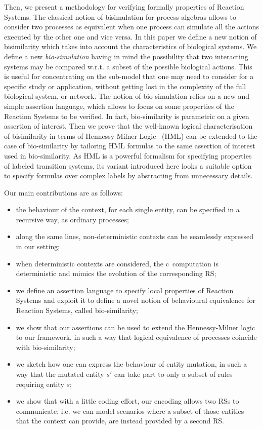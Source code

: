 Then, we present a methodology for verifying formally
properties of Reaction Systems. The classical notion of bisimulation for 
process algebras allows to consider two processes as equivalent 
when one process can simulate all the actions executed 
by the other one and vice versa. In this paper we define a new
notion of bisimilarity which takes into account the characteristics
of biological systems. We define a new {\em bio-simulation} having in mind
the possibility that two interacting systems may be compared w.r.t.
a subset of the possible biological actions. This is useful for concentrating 
on the sub-model that one may need to consider for a specific study or application,
without getting lost in the complexity of the full biological system, or network.
The notion of bio-simulation relies on a new and simple assertion language,
which allows to focus on some properties of the Reaction Systems to be verified.
In fact, bio-similarity is parametric on a given assertion of interest.
Then we prove that the well-known logical characterisation of bisimilarity in terms of Hennessy-Milner Logic~\cite{HM80} (HML)
can be extended to the case of bio-similarity by tailoring HML formulas to
the same assertion of interest used in bio-similarity.  As HML is a powerful
formalism for specifying properties of labeled transition systems, 
its variant introduced here looks a suitable option to specify formulas 
over complex labels by abstracting from unnecessary details.

Our main contributions are as follows:
\begin{itemize}
\item the behaviour of the context, for each single 
entity,
can be
specified in a recursive way, as ordinary processes;
\item along the same lines, non-deterministic contexts can be seamlessly expressed in our setting; 
\item when deterministic contexts are considered, the c\CNA \
computation is deterministic and mimics the evolution of the corresponding RS;
\item we define an assertion language to specify local properties of 
Reaction Systems and exploit it to define a novel notion of behavioural equivalence for Reaction Systems, called bio-similarity;
\item we show that our assertions can be used to extend the Hennessy-Milner logic to our framework, in such a way that logical equivalence of processes coincide with bio-similarity;
\item we sketch how one can express the behaviour of entity mutation,
in such a way that the mutated entity
$s'$ can  take part to only a subset of rules requiring entity $s$;
\item we show that with a little coding effort, our encoding allows two RSs to
communicate; i.e. we can model scenarios where a subset of those entities that the context  can
provide, are instead provided by a second RS.
\end{itemize}

